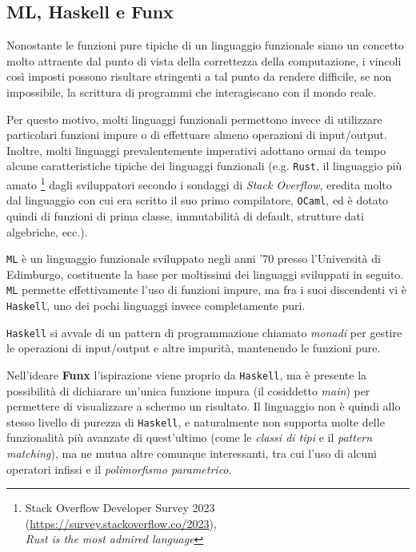 \subsection{ML, Haskell e Funx}
\label{sec:2-2-ml-haskell-funx}

Nonostante le funzioni pure tipiche di un linguaggio funzionale siano un concetto molto attraente
dal punto di vista della correttezza della computazione, i vincoli così imposti possono risultare
stringenti a tal punto da rendere difficile, se non impossibile, la scrittura di programmi che
interagiscano con il mondo reale.


Per questo motivo, molti linguaggi funzionali permettono invece di utilizzare particolari funzioni
impure o di effettuare almeno operazioni di input/output. Inoltre, molti linguaggi prevalentemente
imperativi adottano ormai da tempo alcune caratteristiche tipiche dei linguaggi funzionali
(e.g. \texttt{Rust}, il linguaggio più amato%
\footnote{Stack Overflow Developer Survey 2023 (\url{https://survey.stackoverflow.co/2023}), \\
    \textit{Rust is the most admired language}}
dagli sviluppatori secondo i sondaggi di \textit{Stack Overflow},
eredita molto dal linguaggio con cui era scritto il suo primo compilatore, \texttt{OCaml}, ed è dotato quindi di
funzioni di prima classe, immutabilità di default, strutture dati algebriche, ecc.).


\texttt{ML} è un linguaggio funzionale sviluppato negli anni '70 presso l'Università di Edimburgo,
costituente la base per moltissimi dei linguaggi sviluppati in seguito.
\texttt{ML} permette effettivamente l'uso di funzioni impure, ma fra i suoi discendenti
vi è \texttt{Haskell}, uno dei pochi linguaggi invece completamente puri.

\noindent \texttt{Haskell} si avvale di un pattern di programmazione chiamato \textit{monadi} {\cite{Moggi-1991-ComputationMonads}}
per gestire le operazioni di input/output e altre impurità, mantenendo le funzioni pure.


Nell'ideare \textbf{Funx} l'ispirazione viene proprio da \texttt{Haskell}, ma è presente la possibilità
di dichiarare un'unica funzione impura (il cosiddetto \textit{main}) per permettere di visualizzare a schermo un risultato.
Il linguaggio non è quindi allo stesso livello di purezza di \texttt{Haskell}, e naturalmente non supporta
molte delle funzionalità più avanzate di quest'ultimo (come le \textit{classi di tipi} e il \textit{pattern matching}),
ma ne mutua altre comunque interessanti, tra cui l'uso di alcuni operatori infissi e il \textit{polimorfismo parametrico}.